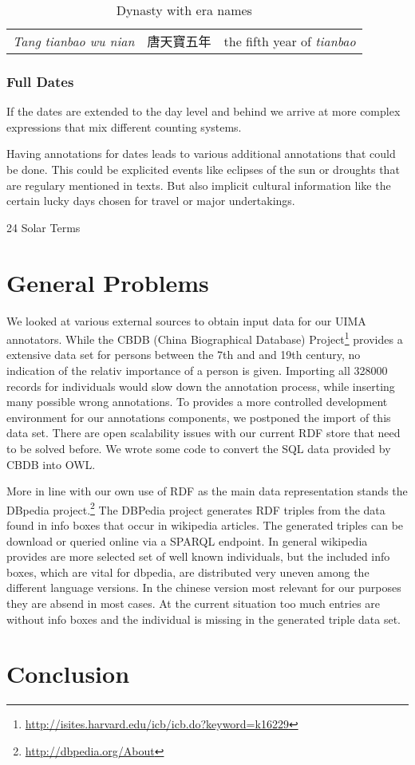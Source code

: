 \documentclass[12pt, draft]{article}
\begin{document}
{\footnotesize
\begin{table}[h]
\caption{Dynasty with era names}
\begin{tabular}{lll}
\hline
\emph{Tang tianbao wu nian} & 唐天寶五年 & the fifth year of \emph{tianbao} \\
\end{tabular}
\end{table}
}


\subsubsection{Full Dates}
If the dates are extended to the day level and behind we arrive at more complex
expressions that mix different counting systems.


Having annotations for dates leads to various additional annotations that could
be done.  This could be explicited  events like eclipses of the sun or droughts that
are regulary mentioned in texts. But also implicit cultural information
like the certain lucky days chosen for travel or major undertakings.
 
24 Solar Terms

\section{General Problems}

We looked at various external sources to obtain
input data for our UIMA annotators.
While the 
CBDB (China Biographical Database) Project\footnote{\url{http://isites.harvard.edu/icb/icb.do?keyword=k16229}}
provides a extensive data set for persons between the 7th and and 19th century, 
no indication of the relativ importance of a person is given.
Importing all 328000 records for individuals would slow down 
the annotation process, while inserting many possible wrong annotations.
To provides a more controlled development environment for our annotations
components, we postponed the import of this data set. There are open
scalability issues with our current RDF store that need to be solved before.
We wrote some code to convert the SQL data provided
by CBDB into OWL.

More in line with our own use of RDF as the main data representation
stands the DBpedia project.\footnote{\url{http://dbpedia.org/About}}
The DBPedia project generates RDF triples from the data found in info boxes that occur in wikipedia articles.
The generated triples can be download or queried online via a SPARQL endpoint.
In general wikipedia provides are more selected set of well known individuals,
but the included info boxes, which are vital for dbpedia, are distributed
very uneven among the different language versions. In the chinese version
most relevant for our purposes they are absend in most cases.
At the current situation too much entries
are without info boxes and the individual is missing in the generated triple data set.

\section{Conclusion}



\end{document}
